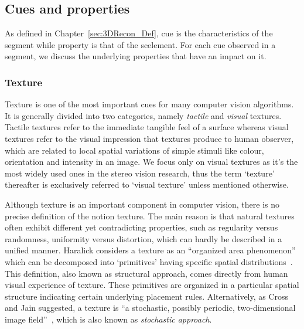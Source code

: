 \subsection{Cues and properties}
As defined in Chapter~\ref{sec:3DRecon_Def}, cue is the characteristics of the segment while property is that of the scelement. For each cue observed in a segment, we discuss the underlying properties that have an impact on it.

\subsubsection{Texture}
Texture is one of the most important cues for many computer vision algorithms. It is generally divided into two categories, namely \textit{tactile} and \textit{visual} textures. Tactile textures refer to the immediate tangible feel of a surface whereas visual textures refer to the visual impression that textures produce to human observer, which are related to local spatial variations of simple stimuli like colour, orientation and intensity in an image. We focus only on visual textures as it's the most widely used ones in the stereo vision research, thus the term `texture' thereafter is exclusively referred to `visual texture' unless mentioned otherwise.

Although texture is an important component in computer vision, there is no precise definition of the notion texture. The main reason is that natural textures often exhibit different yet contradicting properties, such as regularity versus randomness, uniformity versus distortion, which can hardly be described in a unified manner. Haralick considers a texture as an ``organized area phenomenon'' which can be decomposed into `primitives' having specific spatial distributions~\cite{haralick1979statistical}. This definition, also known as structural approach, comes directly from human visual experience of texture. These primitives are organized in a particular spatial structure indicating certain underlying placement rules. Alternatively, as Cross and Jain suggested, a texture is ``a stochastic, possibly periodic, two-dimensional image field''~\cite{cross1983markov}, which is also known as \textit{stochastic approach}.


